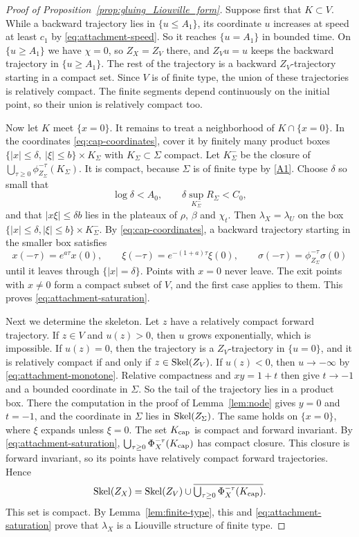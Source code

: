 \documentclass[12pt, letter]{amsart}
\theoremstyle{definition}
\begin{document}
\begin{proof}[Proof of Proposition~\ref{prop:gluing_Liouville_form}]
Suppose first that $K\subset V$.
While a backward trajectory lies in $\{u\le A_1\}$, its coordinate $u$ increases at speed at least $c_1$ by \eqref{eq:attachment-speed}.
So it reaches $\{u=A_1\}$ in bounded time.
On $\{u\ge A_1\}$ we have $\chi=0$, so $Z_X=Z_V$ there, and $Z_Vu=u$ keeps the backward trajectory in $\{u\ge A_1\}$.
The rest of the trajectory is a backward $Z_V$-trajectory starting in a compact set.
Since $V$ is of finite type, the union of these trajectories is relatively compact.
The finite segments depend continuously on the initial point, so their union is relatively compact too.

Now let $K$ meet $\{x=0\}$.
It remains to treat a neighborhood of $K\cap\{x=0\}$.
In the coordinates \eqref{eq:cap-coordinates}, cover it by finitely many product boxes $\{|x|\le\delta,\ |\xi|\le b\}\times K_\Sigma$ with $K_\Sigma\subset\Sigma$ compact.
Let $K_\Sigma^-$ be the closure of $\bigcup_{\tau\ge0}\phi_{Z_\Sigma}^{-\tau}(K_\Sigma)$.
It is compact, because $\Sigma$ is of finite type by \ref{A1}.
Choose $\delta$ so small that
\[
 \log\delta<A_0,\qquad \delta\sup_{K_\Sigma^-}R_\Sigma<C_0,
\]
and that $|x\xi|\le\delta b$ lies in the plateaux of $\rho$, $\beta$ and $\chi_t$.
Then $\lambda_X=\lambda_U$ on the box $\{|x|\le\delta,|\xi|\le b\}\times K_\Sigma^-$.
By \eqref{eq:cap-coordinates}, a backward trajectory starting in the smaller box satisfies
\[
 x(-\tau)=e^{a\tau}x(0),\qquad\xi(-\tau)=e^{-(1+a)\tau}\xi(0),\qquad\sigma(-\tau)=\phi_{Z_\Sigma}^{-\tau}\sigma(0)
\]
until it leaves through $\{|x|=\delta\}$.
Points with $x=0$ never leave.
The exit points with $x\ne0$ form a compact subset of $V$, and the first case applies to them.
This proves \eqref{eq:attachment-saturation}.

Next we determine the skeleton.
Let $z$ have a relatively compact forward trajectory.
If $z\in V$ and $u(z)>0$, then $u$ grows exponentially, which is impossible.
If $u(z)=0$, then the trajectory is a $Z_V$-trajectory in $\{u=0\}$, and it is relatively compact if and only if $z\in\operatorname{Skel}(Z_V)$.
If $u(z)<0$, then $u\to-\infty$ by \eqref{eq:attachment-monotone}.
Relative compactness and $xy=1+t$ then give $t\to-1$ and a bounded coordinate in $\Sigma$.
So the tail of the trajectory lies in a product box.
There the computation in the proof of Lemma~\ref{lem:node} gives $y=0$ and $t=-1$, and the coordinate in $\Sigma$ lies in $\operatorname{Skel}(Z_\Sigma)$.
The same holds on $\{x=0\}$, where $\xi$ expands unless $\xi=0$.
The set $K_{\mathrm{cap}}$ is compact and forward invariant.
By \eqref{eq:attachment-saturation}, $\bigcup_{\tau\ge0}\Phi_X^{-\tau}(K_{\mathrm{cap}})$ has compact closure.
This closure is forward invariant, so its points have relatively compact forward trajectories.
Hence
\[
 \operatorname{Skel}(Z_X)=\operatorname{Skel}(Z_V)\cup
 \overline{\textstyle\bigcup_{\tau\ge0}\Phi_X^{-\tau}(K_{\mathrm{cap}})}.
\]
This set is compact.
By Lemma~\ref{lem:finite-type}, this and \eqref{eq:attachment-saturation} prove that \(\lambda_X\) is a Liouville structure of finite type.


\end{proof}
\end{document}
